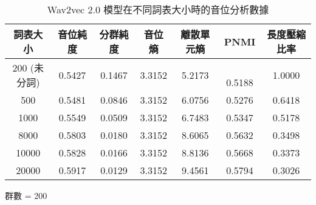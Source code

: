 \begin{table}[!htbp]
    \vspace{0.01cm}        

    \begin{subtable}[t]{\textwidth}
        \centering
        \begin{tabular}{|c|c|c|c|c|c|c|} \hline 
                詞表大小  & 音位純度 & 分群純度 & 音位熵 & 離散單元熵 &    PNMI & 長度壓縮比率 \\ \hline 
 200 (未分詞)&  0.5427 &   0.1467 & 3.3152 &     5.2173 &　0.5188 &1.0000\\ \hline 
                  500  &   0.5481&     0.0846    &3.3152 &   6.0756  &       0.5276 &0.6418 \\ \hline %
                 1000  &   0.5549&     0.0509    &3.3152 &   6.7483  &       0.5347 &0.5178 \\ \hline %
                 8000  &   0.5803&     0.0180    &3.3152 &   8.6065  &       0.5632 &0.3498 \\ \hline %
                10000  &   0.5828&     0.0166    &3.3152 &   8.8136  &       0.5668 &0.3373 \\ \hline %
                20000  &   0.5917&     0.0129    &3.3152 &   9.4561  &       0.5794 &0.3026  \\ \hline %
        \end{tabular}
\caption{群數 = 200}
        \label{tab:ch4-w2v2-phn-clu200}
    \end{subtable}        

\caption{Wav2vec 2.0 模型在不同詞表大小時的音位分析數據}
    \label{tab:w2v2-phn-results}
\end{table}



